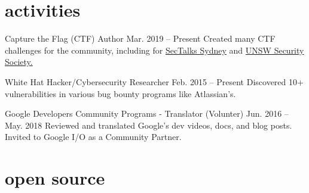 \documentclass[hidelinks__VERSION__]{adamyi-cv}
\begin{document}

\section{activities}

\begin{entrylist}


\entry
{Capture the Flag (CTF) Author}
{Mar. 2019 -- Present}
{Created many CTF challenges for the community, including for \href{https://www.sectalks.org/sydney/}{SecTalks Sydney} and \href{https://unswsecurity.com/}{UNSW Security Society.}}


\entry
{White Hat Hacker/Cybersecurity Researcher}
{Feb. 2015 -- Present}
{Discovered 10+ vulnerabilities in various bug bounty programs like Atlassian's.}


\entry
{Google Developers Community Programs - Translator (Volunter)}
{Jun. 2016 -- May. 2018}
{Reviewed and translated Google's dev videos, docs, and blog posts. Invited to Google I/O as a Community Partner.}

\end{entrylist}


\section{open source}
\end{document}
